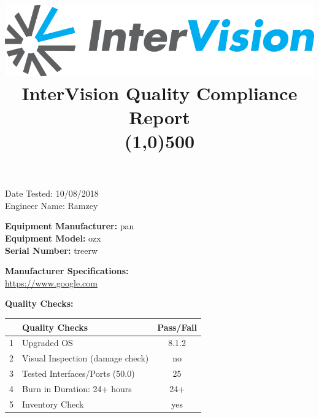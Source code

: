 \documentclass[12pt]{article}
\author{}
\title{\includegraphics[scale=1]{IV_logo.png}
\\InterVision Quality Compliance Report\\\line(1,0){500}\vspace{-8ex}}
\date{}
\begin{document}
\maketitle
\begin{flushright}
Date Tested: 10/08/2018\\
Engineer Name: Ramzey\\
\end{flushright}
\begin{flushleft}
\textbf{Equipment Manufacturer: } pan\\
\textbf{Equipment Model: } ozx\\
\textbf{Serial Number: } treerw\\
\end{flushleft}
\begin{flushleft}
\textbf{Manufacturer Specifications:} \\\url{https://www.google.com} \\
\end{flushleft}
\begin{flushleft}
\textbf{Quality Checks:} 
\end{flushleft}
\begin{table}[H]
\centering
\begin{tabular}{|c|l|c|}
 \hline
& \textbf{Quality Checks}  & \textbf{Pass/Fail} \\ \hline
1& Upgraded OS & 8.1.2 \\ \hline
2& Visual Inspection (damage check) & no \\ \hline
3& Tested Interfaces/Ports (50.0) & 25 \\ \hline
4& Burn in Duration: 24+ hours & 24+ \\ \hline
5& Inventory Check & yes \\ \hline
\end{tabular}
\end{table}
\end{document}
